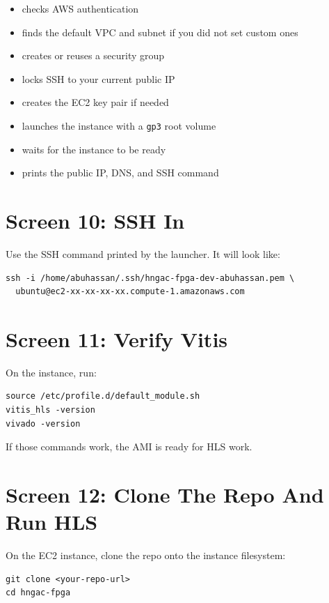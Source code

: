 \documentclass[11pt]{article}
\begin{document}
\begin{itemize}
\item checks AWS authentication
\item finds the default VPC and subnet if you did not set custom ones
\item creates or reuses a security group
\item locks SSH to your current public IP
\item creates the EC2 key pair if needed
\item launches the instance with a \texttt{gp3} root volume
\item waits for the instance to be ready
\item prints the public IP, DNS, and SSH command
\end{itemize}

\section*{Screen 10: SSH In}

Use the SSH command printed by the launcher. It will look like:

\begin{verbatim}
ssh -i /home/abuhassan/.ssh/hngac-fpga-dev-abuhassan.pem \
  ubuntu@ec2-xx-xx-xx-xx.compute-1.amazonaws.com
\end{verbatim}

\section*{Screen 11: Verify Vitis}

On the instance, run:

\begin{verbatim}
source /etc/profile.d/default_module.sh
vitis_hls -version
vivado -version
\end{verbatim}

If those commands work, the AMI is ready for HLS work.

\section*{Screen 12: Clone The Repo And Run HLS}

On the EC2 instance, clone the repo onto the instance filesystem:

\begin{verbatim}
git clone <your-repo-url>
cd hngac-fpga
\end{verbatim}
\end{document}
